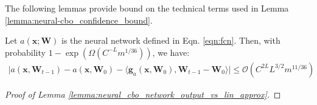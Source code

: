 The following lemmas provide bound on the technical terms used in Lemma \ref{lemma:neural-cbo_confidence_bound}.

\begin{lemma} Let $a(\mathbf{x}; \mathbf{W})$ is the neural network defined in Eqn. \ref{eqn:fcn}. Then, with probability $1 - \exp (\Omega(C^{-L} m^{1/36}))$, we have: 
\label{lemma:neural_cbo_network_output_vs_lin_approx}
    \begin{align*}
        \lvert a(\mathbf{x}, \mathbf{W}_{t-1}) - a(\mathbf{x}, \mathbf{W}_{0}) - \langle \mathbf{g}_{a}(\mathbf{x}, \mathbf{W}_0), \mathbf{W}_{t-1} - \mathbf{W}_0 \rangle \rvert \le \mathcal{O}(C^{2L} L^{3/2} m^{11/36})
    \end{align*}
\end{lemma}

\begin{proof}[Proof of Lemma \ref{lemma:neural_cbo_network_output_vs_lin_approx}]



\end{proof}
